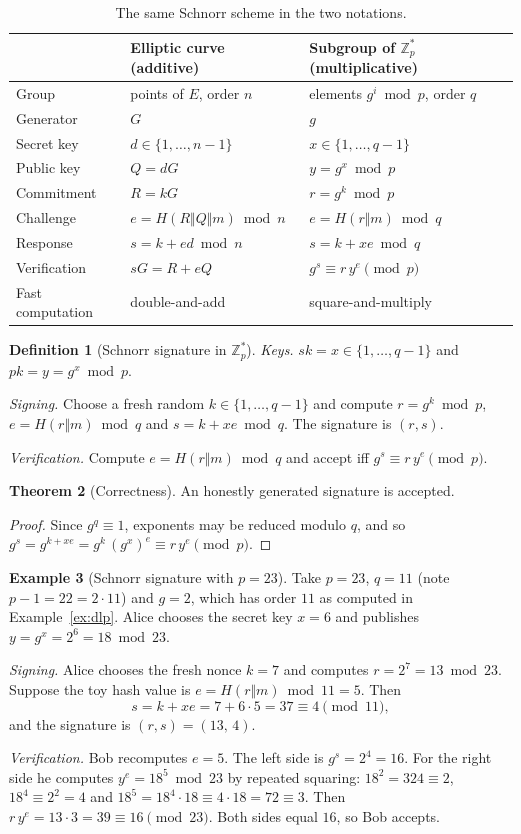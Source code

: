 \documentclass[11pt,a4paper]{article}
\theoremstyle{definition}
\newtheorem{definition}{Definition}[section]
\newtheorem{theorem}[definition]{Theorem}
\newtheorem{example}[definition]{Example}
\newcommand{\Z}{\mathbb{Z}}
\newcommand{\sk}{\mathit{sk}}
\newcommand{\pk}{\mathit{pk}}
\newcommand{\Hash}{H}
\begin{document}
\begin{table}[h]
\centering
\begin{tabular}{lll}
\toprule
 & Elliptic curve (additive) & Subgroup of $\Z_p^*$ (multiplicative)\\
\midrule
Group & points of $E$, order $n$ & elements $g^i \bmod p$, order $q$\\
Generator & $G$ & $g$\\
Secret key & $d\in\{1,\dots,n-1\}$ & $x\in\{1,\dots,q-1\}$\\
Public key & $Q=dG$ & $y=g^x \bmod p$\\
Commitment & $R=kG$ & $r=g^k \bmod p$\\
Challenge & $e=\Hash(R\Vert Q\Vert m) \bmod n$ & $e=\Hash(r\Vert m) \bmod q$\\
Response & $s=k+ed \bmod n$ & $s=k+xe \bmod q$\\
Verification & $sG=R+eQ$ & $g^s\equiv r\,y^e \pmod p$\\
Fast computation & double-and-add & square-and-multiply\\
\bottomrule
\end{tabular}
\caption{The same Schnorr scheme in the two notations.}\label{tab:dictionary}
\end{table}

\begin{definition}[Schnorr signature in $\Z_p^*$]
\emph{Keys.} $\sk=x\in\{1,\dots,q-1\}$ and $\pk=y=g^x \bmod p$.

\emph{Signing.} Choose a fresh random $k\in\{1,\dots,q-1\}$ and compute $r=g^k \bmod p$, $e=\Hash(r\Vert m) \bmod q$ and $s=k+xe \bmod q$. The signature is $(r,s)$.

\emph{Verification.} Compute $e=\Hash(r\Vert m) \bmod q$ and accept iff $g^s\equiv r\,y^e \pmod p$.
\end{definition}

\begin{theorem}[Correctness]
An honestly generated signature is accepted.
\end{theorem}
\begin{proof}
Since $g^q\equiv 1$, exponents may be reduced modulo $q$, and so $g^s=g^{k+xe}=g^k\,(g^x)^e\equiv r\,y^e \pmod p$.
\end{proof}

\begin{example}[Schnorr signature with $p=23$]\label{ex:schnorrmult}
Take $p=23$, $q=11$ (note $p-1=22=2\cdot 11$) and $g=2$, which has order $11$ as computed in Example~\ref{ex:dlp}. Alice chooses the secret key $x=6$ and publishes $y=g^x=2^6=18 \bmod 23$.

\emph{Signing.} Alice chooses the fresh nonce $k=7$ and computes $r=2^7=13 \bmod 23$. Suppose the toy hash value is $e=\Hash(r\Vert m) \bmod 11=5$. Then
\[
s=k+xe=7+6\cdot 5=37\equiv 4 \pmod{11},
\]
and the signature is $(r,s)=(13,\,4)$.

\emph{Verification.} Bob recomputes $e=5$. The left side is $g^s=2^4=16$. For the right side he computes $y^e=18^5 \bmod 23$ by repeated squaring: $18^2=324\equiv 2$, $18^4\equiv 2^2=4$ and $18^5=18^4\cdot 18\equiv 4\cdot 18=72\equiv 3$. Then $r\,y^e=13\cdot 3=39\equiv 16 \pmod{23}$. Both sides equal $16$, so Bob accepts.
\end{example}
\end{document}
